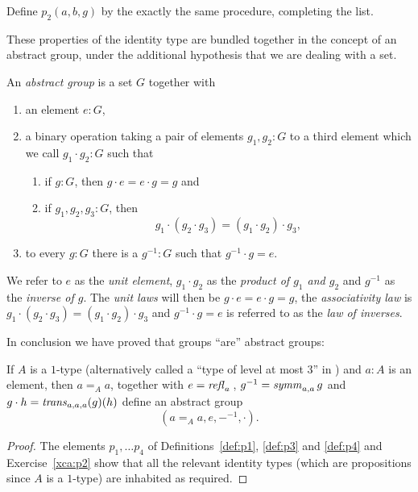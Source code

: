 \begin{xca}\label{xca:p2}
    Define $p_2(a,b,g)$ %
by the exactly the same procedure, completing the list.
\end{xca}


These properties of the identity type are bundled together in the concept of an abstract group, under the additional hypothesis that we are dealing with a set.

  \begin{definition}\label{def:abstractgroup}
    An {\em abstract group} is a set $G$ together with
\begin{enumerate}
\item an element $e:G$, 
\item a binary operation taking a pair of elements $g_1,g_2:G$ to a third element which we call $g_1\cdot g_2:G$ such that
  \begin{enumerate}
  \item %
if $g:G$, then $g\cdot e=e\cdot g=g$ and
  \item %
if $g_1,g_2,g_3:G$, then 
$$g_1\cdot(g_2\cdot g_3)=(g_1\cdot g_2)\cdot g_3,$$
  \end{enumerate}
\item %
to every $g:G$ there is a $g^{-1}:G$ such that $%
g^{-1}\cdot g=e$.
\end{enumerate} 
We refer to $e$ as the {\em unit element}, $g_1\cdot g_2$ as the {\em product of $g_1$ and $g_2$} and $g^{-1}$ as the {\em inverse of $g$}.  The {\em unit laws} will then be $g\cdot e=e\cdot g=g$, the {\em associativity law} is $g_1\cdot(g_2\cdot g_3)=(g_1\cdot g_2)\cdot g_3$ and $%
g^{-1}\cdot g=e$ is referred to as the {\em law of inverses}. 
  \end{definition}

In conclusion we have proved that groups ``are'' abstract groups:

  \begin{lemma}\label{lem:idtypesgiveabstractgroups}
    If $A$ is a $1$-type (alternatively called a ``type of level at most $3$'' in ) and $a:A$ is an element, then $a=_Aa$, together with $e=\mathop{{\it refl}_{a}}{}$, $g^{-1}=\mathop{\mathit{symm}}_{a,a}g$ and $g\cdot h=\mathop{\mathit{trans}}_{a,a,a}(g)(h)$ define an abstract group 
$$(a=_Aa,e,{-}^{-1},\cdot).$$
  \end{lemma}
  \begin{proof}
    The elements $p_1,\dots p_4$ of Definitions~\ref{def:p1}, \ref{def:p3} and \ref{def:p4} and
Exercise~\ref{xca:p2} show that all the relevant identity types (which are propositions since $A$ is a $1$-type) are inhabited as required.
  \end{proof}

